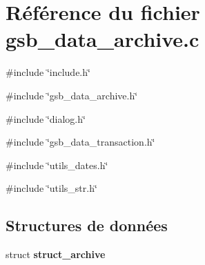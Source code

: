 \section{Référence du fichier gsb\_\-data\_\-archive.c}
\label{gsb__data__archive_8c}
{\ttfamily \#include \char`\"{}include.h\char`\"{}}\par
{\ttfamily \#include \char`\"{}gsb\_\-data\_\-archive.h\char`\"{}}\par
{\ttfamily \#include \char`\"{}dialog.h\char`\"{}}\par
{\ttfamily \#include \char`\"{}gsb\_\-data\_\-transaction.h\char`\"{}}\par
{\ttfamily \#include \char`\"{}utils\_\-dates.h\char`\"{}}\par
{\ttfamily \#include \char`\"{}utils\_\-str.h\char`\"{}}\par
\subsection*{Structures de données}
\begin{DoxyCompactItemize}
\item 
struct {\bf struct\_\-archive}
\end{DoxyCompactItemize}
